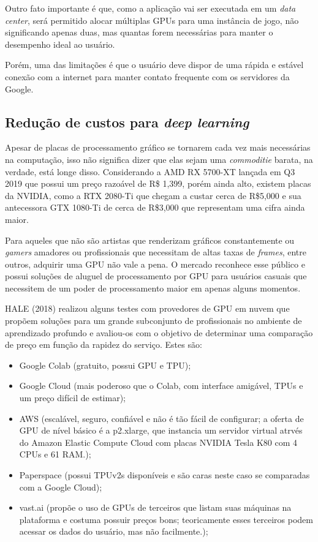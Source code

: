 \documentclass[letterpaper, 10 pt, conference]{ieeeconf}  %
\begin{document}
Outro fato importante é que, como a aplicação vai ser executada em um \textit{data center}, será permitido alocar múltiplas GPUs para uma instância de jogo, não significando apenas duas, mas quantas forem necessárias para manter o desempenho ideal ao usuário. 

Porém, uma das limitações é que o usuário deve dispor de uma rápida e estável conexão com a internet para manter contato frequente com os servidores da Google.

\subsection{Redução de custos para \textit{deep learning}}

Apesar de placas de processamento gráfico se tornarem cada vez mais necessárias na computação, isso não significa dizer que elas sejam uma \textit{commoditie} barata, na verdade, está longe disso. Considerando a AMD RX 5700-XT lançada em Q3 2019 que possui um preço razoável de R\$ 1,399, porém ainda alto, existem placas da NVIDIA, como a RTX 2080-Ti que chegam a custar cerca de R\$5,000 e sua antecessora GTX 1080-Ti de cerca de R\$3,000 que representam uma cifra ainda maior.

Para aqueles que não são artistas que renderizam gráficos constantemente ou \textit{gamers} amadores ou profissionais que necessitam de altas taxas de \textit{frames}, entre outros, adquirir uma GPU não vale a pena. O mercado reconhece esse público e possui soluções de aluguel de processamento por GPU para usuários casuais que necessitem de um poder de processamento maior em apenas alguns momentos.

HALE (2018) realizou alguns testes com provedores de GPU em nuvem que propõem soluções para um grande subconjunto de profissionais no ambiente de aprendizado profundo e avaliou-os com o objetivo de determinar uma comparação de preço em função da rapidez do serviço. Estes são:

\begin{itemize}
    \item Google Colab (gratuito, possui GPU e TPU);
    \item Google Cloud (mais poderoso que o Colab, com interface amigável, TPUs e um preço difícil de estimar);
    \item AWS (escalável, seguro, confiável e não é tão fácil de configurar; a oferta de GPU de nível básico é a p2.xlarge, que instancia um servidor virtual atrvés do Amazon Elastic Compute Cloud com placas NVIDIA Tesla K80 com 4 CPUs e 61 RAM.);
    \item Paperspace (possui TPUv2s disponíveis e são caras neste caso se comparadas com a Google Cloud);
    \item vast.ai (propõe o uso de GPUs de terceiros que listam suas máquinas na plataforma e costuma possuir preços bons; teoricamente esses terceiros podem acessar os dados do usuário, mas não facilmente.);
\end{itemize}
\end{document}
